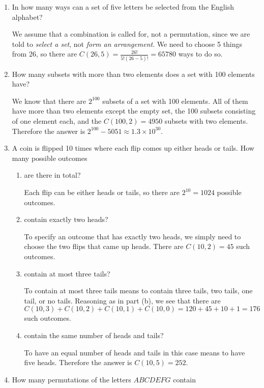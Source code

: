 \documentclass[11pt]{article}
\begin{document}
\begin{enumerate}[label=\textbf{\arabic*.}]
	\item In how many ways can a set of five letters be selected from the English alphabet?
	
	We assume that a combination is called for, not a permutation, since we are told to \emph{select a set}, not \emph{form an arrangement}. We need to choose 5 things from 26, so there are $C(26, 5) = \frac{26!}{5!(26 - 5)!} = 65780$ ways to do so.
	
	\item How many subsets with more than two elements does a set with 100 elements have?
	
	We know that there are $2^{100}$ subsets of a set with 100 elements. All of them have more than two elements except the empty set, the 100 subsets consisting of one element each, and the $C(100, 2) = 4950$ subsets with two elements. Therefore the answer is $2^{100} - 5051 \approx 1.3 \times 10^{30}$.
	
	\item A coin is flipped 10 times where each flip comes up either heads or tails. How many possible outcomes
	
	\begin{enumerate}[label=\textbf{\alph*)}]
		\item are there in total?
		
		Each flip can be either heads or tails, so there are $2^{10} = 1024$ possible outcomes. 
		
		\item contain exactly two heads?
		
		To specify an outcome that has exactly two heads, we simply need to choose the two flips that came up heads. There are $C(10, 2) = 45$ such outcomes.
		
		\item contain at most three tails?
		
		To contain at most three tails means to contain three tails, two tails, one tail, or no tails. Reasoning as in part (b), we see that there are $C(10, 3) + C(10, 2) + C(10, 1) + C(10, 0) = 120 + 45 + 10 + 1 = 176$ such outcomes.
		
		\item contain the same number of heads and tails?
		
		To have an equal number of heads and tails in this case means to have five heads. Therefore the answer is $C(10, 5) = 252$.
	\end{enumerate}

	\item How many permutations of the letters $ABCDEFG$ contain
	

\end{enumerate}
\end{document}
